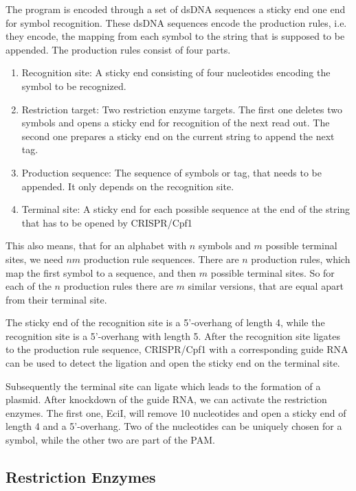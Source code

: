 \documentclass[
11pt, %
a4paper, %
oneside, %
headinclude,footinclude, %
BCOR5mm, %
]{scrartcl}
\begin{document}
The program is encoded through a set of dsDNA sequences a sticky end one end for
symbol recognition.
These dsDNA sequences encode the production rules, i.e. they encode, the
mapping from each symbol to the string that is supposed to be appended.
The production rules consist of four parts.

\begin{enumerate}
  \item Recognition site: A sticky end consisting of four nucleotides encoding
    the symbol to be recognized.
  \item Restriction target: Two restriction enzyme targets. The first one
    deletes two symbols and opens a sticky end for recognition of the next
    read out. The second one prepares a sticky end on the current string to
    append the next tag.
  \item Production sequence: The sequence of symbols or tag, that needs to be
    appended. It only depends on the recognition site.
  \item Terminal site: A sticky end for each possible sequence at the end of
    the string that has to be opened by CRISPR/Cpf1
\end{enumerate}

This also means, that for an alphabet with $n$ symbols and $m$ possible terminal
sites, we need $nm$ production rule sequences.
There are $n$ production rules, which map the first symbol to a sequence, and
then $m$ possible terminal sites.
So for each of the $n$ production rules there are $m$ similar versions, that
are equal apart from their terminal site.

The sticky end of the recognition site is a 5'-overhang of length 4, while
the recognition site is a 5'-overhang with length 5.
After the recognition site ligates to the production rule sequence, CRISPR/Cpf1
with a corresponding guide RNA can be used to detect the ligation and open the
sticky end on the terminal site.

Subsequently the terminal site can ligate which leads to the formation of a
plasmid.
After knockdown of the guide RNA, we can activate the restriction enzymes.
The first one, EciI, will remove 10 nucleotides and open a sticky end of length
4 and a 5'-overhang.
Two of the nucleotides can be uniquely chosen for a symbol, while the other two
are part of the PAM.

\subsection{Restriction Enzymes}
\end{document}
